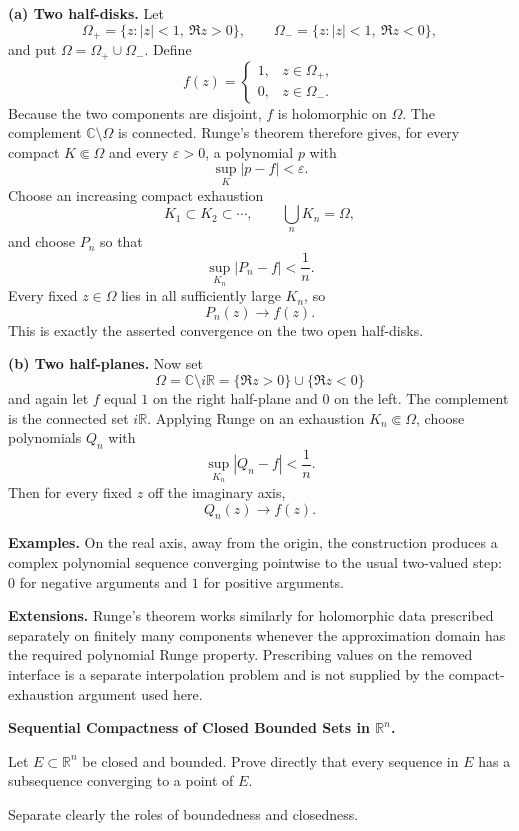\begin{solution}

\par\smallskip\noindent\textbf{(a) Two half-disks.}
Let
\[
\Omega_+=\{z:|z|<1,\ \Re z>0\},
\qquad
\Omega_-=\{z:|z|<1,\ \Re z<0\},
\]
and put \(\Omega=\Omega_+\cup\Omega_-\). Define
\[
f(z)=
\begin{cases}
1,&z\in\Omega_+,\\
0,&z\in\Omega_-.
\end{cases}
\]
Because the two components are disjoint, \(f\) is holomorphic on \(\Omega\).
The complement \(\mathbb C\setminus\Omega\) is connected. Runge's theorem
therefore gives, for every compact \(K\Subset\Omega\) and every
\(\varepsilon>0\), a polynomial \(p\) with
\[
\sup_K|p-f|<\varepsilon.
\]
Choose an increasing compact exhaustion
\[
K_1\subset K_2\subset\cdots,
\qquad
\bigcup_nK_n=\Omega,
\]
and choose \(P_n\) so that
\[
\sup_{K_n}|P_n-f|<\frac1n.
\]
Every fixed \(z\in\Omega\) lies in all sufficiently large \(K_n\), so
\[
P_n(z)\to f(z).
\]
This is exactly the asserted convergence on the two open half-disks.

\par\smallskip\noindent\textbf{(b) Two half-planes.}
Now set
\[
\Omega=\mathbb C\setminus i\mathbb R
=
\{\Re z>0\}\cup\{\Re z<0\}
\]
and again let \(f\) equal \(1\) on the right half-plane and \(0\) on the
left. The complement is the connected set \(i\mathbb R\). Applying Runge on
an exhaustion \(K_n\Subset\Omega\), choose polynomials \(Q_n\) with
\[
\sup_{K_n}|Q_n-f|<\frac1n.
\]
Then for every fixed \(z\) off the imaginary axis,
\[
\boxed{Q_n(z)\to f(z).}
\]

\medskip
\noindent\textbf{Examples.}
On the real axis, away from the origin, the construction produces a complex
polynomial sequence converging pointwise to the usual two-valued step:
\(0\) for negative arguments and \(1\) for positive arguments.

\medskip
\noindent\textbf{Extensions.}
Runge's theorem works similarly for holomorphic data prescribed separately on
finitely many components whenever the approximation domain has the required
polynomial Runge property. Prescribing values on the removed interface is a
separate interpolation problem and is not supplied by the compact-exhaustion
argument used here.
\end{solution}

\begin{problem}[CP-II-0323]
\label{prob:cp-ii-0323}
\textbf{Sequential Compactness of Closed Bounded Sets in \(\mathbb R^n\).}

\hspace*{1.5em}Let \(E\subset\mathbb R^n\) be closed and bounded. Prove directly that every
sequence in \(E\) has a subsequence converging to a point of \(E\).

Separate clearly the roles of boundedness and closedness.
\end{problem}

